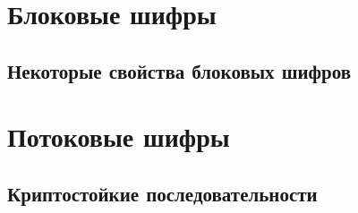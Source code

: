 \documentclass[10pt,a4paper]{book}
\begin{document}
%







\chapter{Блоковые шифры}









\section{Некоторые свойства блоковых шифров}









\chapter{Потоковые шифры}



\section{Криптостойкие последовательности} %
\end{document}
